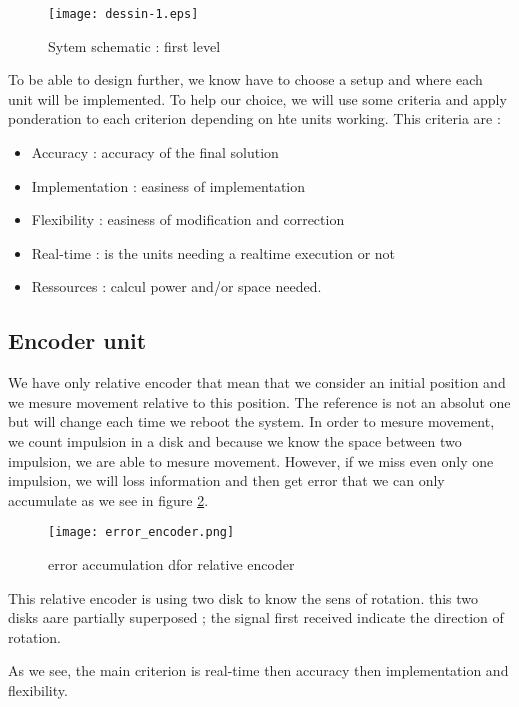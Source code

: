 \begin{figure}[!ht]
\centering
 \texttt{[image: dessin-1.eps]}
 \caption{Sytem schematic : first level}
 \label{sys_sc}
\end{figure}

To be able to design further, we know have to choose a setup and where each unit will be implemented. To help our choice, we will use some criteria and apply ponderation to each criterion depending on hte units working. This criteria are : 
\begin{itemize}
 \item Accuracy : accuracy of the final solution
 \item Implementation : easiness of implementation
 \item Flexibility : easiness of modification and correction
 \item Real-time : is the units needing a realtime execution or not
 \item Ressources : calcul power and/or space needed.
\end{itemize}


\subsection{Encoder unit}

We have only relative encoder that mean that we consider an initial position and we mesure movement relative to this position. The reference is not an absolut one but will change each time we reboot the system. In order to mesure movement, we count impulsion in a disk and because we know the space between two impulsion, we are able to mesure movement. However, if we miss even only one impulsion, we will loss information and then get error that we can only accumulate as we see in figure \ref{err_enc}.  

\begin{figure}[!ht]
\centering
 \texttt{[image: error\_encoder.png]}
 \caption{error accumulation dfor relative encoder}
 \label{err_enc}
\end{figure}

This relative encoder is using two disk to know the sens of rotation. this two disks aare partially superposed ; the signal first received indicate the direction of rotation.

As we see, the main criterion is real-time then accuracy then implementation and flexibility.


